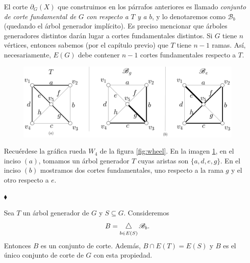 El corte $\partial_{G}(X)$ que construimos en los párrafos anteriores es llamado \textit{conjunto de corte fundamental de $G$ con respecto a $T$ y a $b$}, y lo denotaremos como $\mathscr{B}_{b}$ (quedando el árbol generador implícito). Es preciso mencionar que árboles generadores distintos darán lugar a cortes fundamentales distintos. Si $G$ tiene $n$ vértices, entonces sabemos (por el capítulo previo) que $T$ tiene $n-1$ ramas. Así,  necesariamente, $E(G)$ debe contener $n-1$ cortes fundamentales respecto a $T$.  

\begin{ejem} \label{ejem:cortesfundamentales}
\begin{figure}[H]
\vspace{-0.5 cm}
    \centering
    \includegraphics[scale = 0.18]{img/imgchapter2/bondminimales.jpg}
    \caption{}
    \label{fig:bondminimales}
\end{figure}


Recuérdese la gráfica rueda $W_{4}$ de la figura \ref{fig:wheel}. En la imagen \ref{fig:bondminimales}, en el inciso $(a)$, tomamos un árbol generador $T$ cuyas aristas son $\{a, d, e, g\}$. En el inciso $(b)$ mostramos dos cortes fundamentales, uno respecto a la rama $g$ y el otro respecto a $e$.


\hfill $\blacklozenge$
\end{ejem}



\begin{lema}\label{cortesfundamentalespropchida}
Sea $T$ un árbol generador de $G$ y $S\subseteq G$. Consideremos  
$$
B =\difsym_{b \in E(S)} \mathscr{B}_{b}. 
$$
Entonces $B$ es un conjunto de corte. Además, $B \cap E(T) = E(S)$ y $B$ es el único conjunto de corte de $G$ con esta propiedad.
\end{lema}

